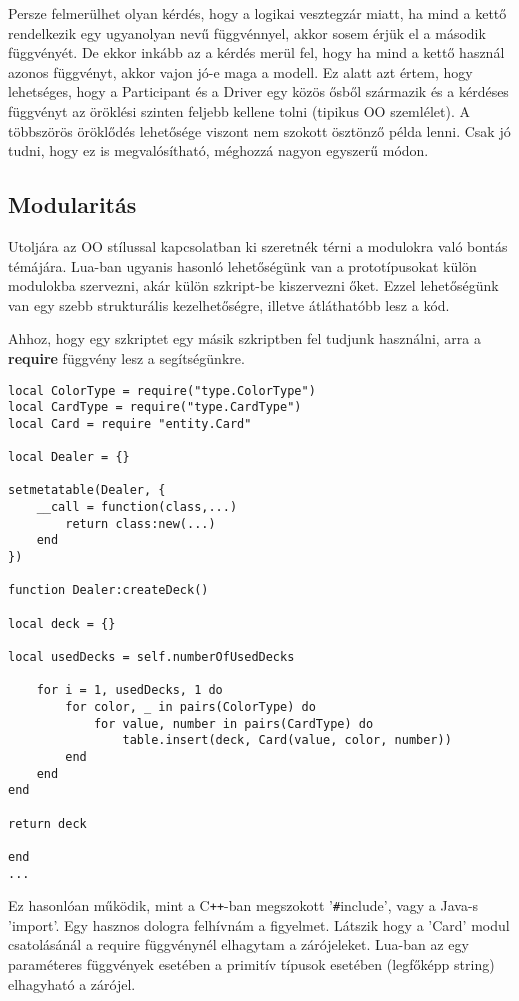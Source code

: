 Persze felmerülhet olyan kérdés, hogy a logikai vesztegzár miatt, ha mind a kettő rendelkezik egy ugyanolyan nevű függvénnyel, akkor sosem érjük el a második függvényét. De ekkor inkább az a kérdés merül fel, hogy ha mind a kettő használ azonos függvényt, akkor vajon jó-e maga a modell. Ez alatt azt értem, hogy lehetséges, hogy a Participant és a Driver egy közös ősből származik és a kérdéses függvényt az öröklési szinten feljebb kellene tolni (tipikus OO szemlélet). A többszörös öröklődés lehetősége viszont nem szokott ösztönző példa lenni. Csak jó tudni, hogy ez is megvalósítható, méghozzá nagyon egyszerű módon.

\subsection{Modularitás}
\label{subsec:l_modul}

Utoljára az OO stílussal kapcsolatban ki szeretnék térni a modulokra való bontás témájára. Lua-ban ugyanis hasonló lehetőségünk van a prototípusokat külön modulokba szervezni, akár külön szkript-be kiszervezni őket. Ezzel lehetőségünk van egy szebb strukturális kezelhetőségre, illetve átláthatóbb lesz a kód. 

Ahhoz, hogy egy szkriptet egy másik szkriptben fel tudjunk használni, arra a \textbf{require} függvény lesz a segítségünkre.
\scriptsize
\begin{lstlisting}
local ColorType = require("type.ColorType")
local CardType = require("type.CardType")
local Card = require "entity.Card"

local Dealer = {}

setmetatable(Dealer, {
	__call = function(class,...)
		return class:new(...)
	end
})

function Dealer:createDeck()

local deck = {}

local usedDecks = self.numberOfUsedDecks

	for i = 1, usedDecks, 1 do
		for color, _ in pairs(ColorType) do
			for value, number in pairs(CardType) do
				table.insert(deck, Card(value, color, number))
		end
	end
end

return deck

end
...
\end{lstlisting}
\normalsize
Ez hasonlóan működik, mint a C\verb|++|-ban megszokott '\verb|#|include', vagy a Java-s 'import'. Egy hasznos dologra felhívnám a figyelmet. Látszik hogy a 'Card' modul csatolásánál a require függvénynél elhagytam a zárójeleket. Lua-ban az egy paraméteres függvények esetében a primitív típusok esetében (legfőképp string) elhagyható a zárójel.

